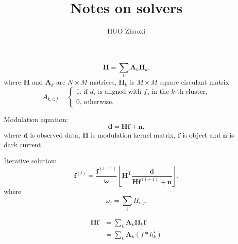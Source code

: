 \documentclass{article}
\newcommand{\vect}[1]{\boldsymbol{#1}}
\newcommand{\trans}[1]{#1^{\mathrm{T}}}
\begin{document}
\title{Notes on solvers}
\author{HUO Zhuoxi}
\maketitle
\begin{equation}
  \vect{H} = \sum_k \vect{A}_k \vect{H}_k \text{,}
\end{equation}
where $\vect{H}$ and $\vect{A}_k$ are $N \times M$ matrices, $\vect{H}_k$ is $M \times M$ square circulant matrix.
\begin{equation}
  A_{k,i,j}=\begin{cases}
  1\text{, if $d_i$ is aligned with $f_j$ in the $k$-th cluster,}\\
  0\text{, otherwise.}
  \end{cases}
\end{equation}

Modulation equation:
\begin{equation}
  \vect{d} = \vect{H}\vect{f} + \vect{n} \text{,}
\end{equation}
where $\vect{d}$ is observed data, $\vect{H}$ is modulation kernel matrix, $\vect{f}$ is object and $\vect{n}$ is dark current.

Iterative solution:
\begin{equation}
  \vect{f}^{\left(l\right)} = \frac{\vect{f}^{\left(l-1\right)}}{\vect{\omega}}\left[\trans{\vect{H}}\frac{\vect{d}}{\vect{H}\vect{f}^{\left(l-1\right)}+\vect{n}}\right]\text{,}
\end{equation}
where
\begin{equation}
  \omega_j = \sum_i H_{i,j} \text{.}
\end{equation}

\begin{equation}
  \begin{split}
    \vect{H}\vect{f}
    & = \sum_k \vect{A}_k \vect{H}_k \vect{f} \\
    & = \sum_k \vect{A}_k \left(f \ast h_k^\star\right)
  \end{split}
\end{equation}
\end{document}
